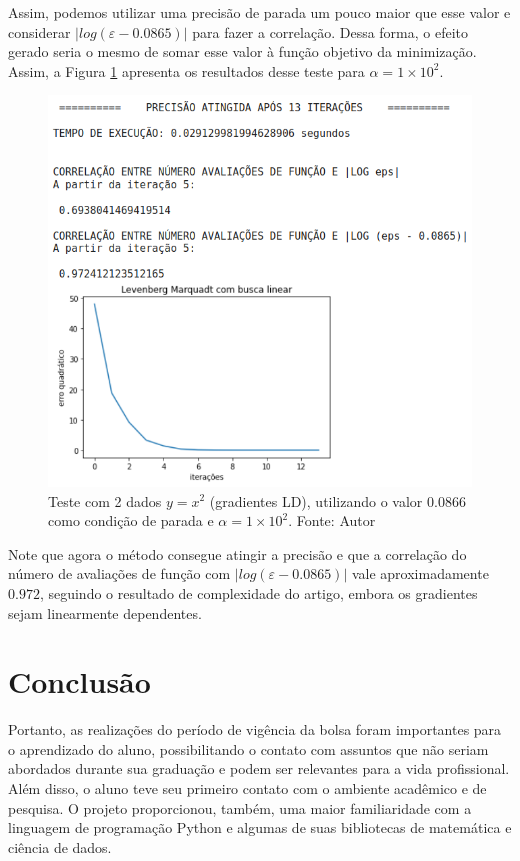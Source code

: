 \documentclass[11pt]{article}
\begin{document}
Assim, podemos utilizar uma precisão de parada um pouco maior que esse valor e considerar $|log(\varepsilon - 0.0865)|$ para fazer a correlação. Dessa forma, o efeito gerado seria o mesmo de somar esse valor à função objetivo da minimização. Assim, a Figura \ref{a2sh} apresenta os resultados desse teste para $\alpha = 1\times 10^{2}$.

\begin{figure}[H]
\center
\includegraphics[scale=0.7]{Figuras/a2sh.png}
\caption{Teste com 2 dados $y = x^2$ (gradientes LD), utilizando o valor $0.0866$ como condição de parada e $\alpha = 1\times 10^{2}$. Fonte: Autor} 
\label{a2sh}
\end{figure}

Note que agora o método consegue atingir a precisão e que a correlação do número de avaliações de função com $|log(\varepsilon - 0.0865)|$ vale aproximadamente $0.972$, seguindo o resultado de complexidade do artigo, embora os gradientes sejam linearmente dependentes. 

\section{Conclusão}
Portanto, as realizações do período de vigência da bolsa foram importantes para o aprendizado do aluno, possibilitando o contato com assuntos que não seriam abordados durante sua graduação e podem ser relevantes para a vida profissional. Além disso, o aluno teve seu primeiro contato com o ambiente acadêmico e de pesquisa. O projeto proporcionou, também, uma maior familiaridade com a linguagem de programação Python e algumas de suas bibliotecas de matemática e ciência de dados.
\end{document}
